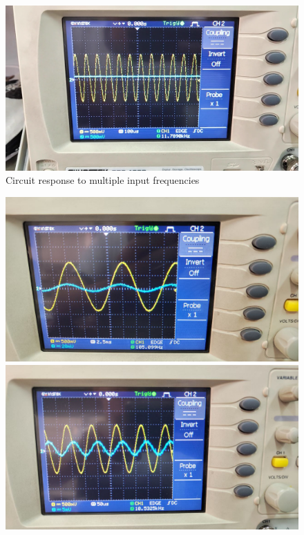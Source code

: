 \documentclass[11pt]{article}
\begin{document}
\begin{question}
\begin{subquestion}
{\begin{figure}[H]
                \includegraphics[scale=0.1,angle=0]{Fig/18.png}
                \caption{Circuit response to multiple input frequencies}
            \end{figure}
            \begin{figure}[H]
                \centering
                \includegraphics[scale=0.1,angle=0]{Fig/19.jpeg}
                \includegraphics[scale=0.1,angle=0]{Fig/20.jpeg}

\end{figure}}
\end{subquestion}
\end{question}
\end{document}

